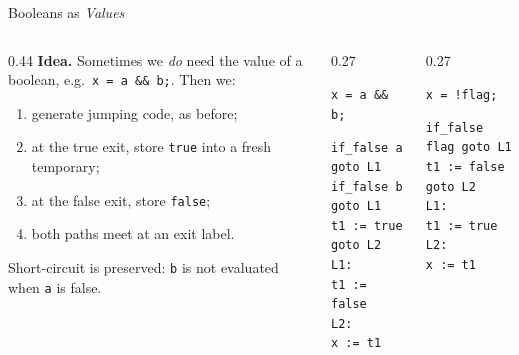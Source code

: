 \documentclass[aspectratio=169]{beamer}
\newcommand{\tc}[1]{\texttt{#1}}
\begin{document}
\begin{frame}[fragile]{Booleans as \emph{Values}}
  \begin{columns}[T]
    \begin{column}{0.44\textwidth}
      \textbf{Idea.} Sometimes we \emph{do} need the value of a boolean,
      e.g.\ \tc{x = a \&\& b;}. Then we:
      \begin{enumerate}
        \item generate jumping code, as before;
        \item at the true exit, store \tc{true} into a fresh temporary;
        \item at the false exit, store \tc{false};
        \item both paths meet at an exit label.
      \end{enumerate}
      Short-circuit is preserved: \tc{b} is not evaluated when \tc{a} is false.
    \end{column}
    \begin{column}{0.27\textwidth}
      \begin{block}{\tc{x = a \&\& b;}}
        \begin{verbatim}
if_false a goto L1
if_false b goto L1
t1 := true
goto L2
L1:
t1 := false
L2:
x := t1
        \end{verbatim}
      \end{block}
    \end{column}
    \begin{column}{0.27\textwidth}
      \begin{block}{\tc{x = !flag;}}
        \begin{verbatim}
if_false flag goto L1
t1 := false
goto L2
L1:
t1 := true
L2:
x := t1
        \end{verbatim}
      \end{block}
    \end{column}
  \end{columns}
\end{frame}
\end{document}
